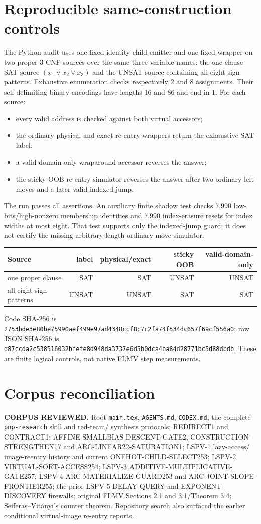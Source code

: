 \documentclass[11pt]{article}
\begin{document}
\section{Reproducible same-construction controls}
The Python audit uses one fixed identity child emitter and one fixed wrapper on
two proper 3-CNF sources over the same three variable names: the one-clause SAT
source $(x_1\vee x_2\vee x_3)$ and the UNSAT source containing all eight sign
patterns.  Exhaustive enumeration checks respectively 2 and 8 assignments.
Their self-delimiting binary encodings have lengths 16 and 86 and end in $1$.
For each source:
\begin{itemize}
\item every valid address is checked against both virtual accessors;
\item the ordinary physical and exact re-entry wrappers return the exhaustive
SAT label;
\item a valid-domain-only wraparound accessor reverses the answer;
\item the sticky-OOB re-entry simulator reverses the answer after two ordinary
left moves and a later valid indexed jump.
\end{itemize}
The run passes all assertions.  An auxiliary finite shadow test checks 7,990
low-bits/high-nonzero membership identities and 7,990 index-erasure resets for
index widths at most eight.  That test supports only the indexed-jump guard;
it does not certify the missing arbitrary-length ordinary-move simulator.

\begin{center}\begin{tabular}{lrrrr}
\toprule
Source&label&physical/exact&sticky OOB&valid-domain-only\\\midrule
one proper clause&SAT&SAT&UNSAT&UNSAT\\
all eight sign patterns&UNSAT&UNSAT&SAT&SAT\\\bottomrule
\end{tabular}\end{center}
Code SHA-256 is
\texttt{2753bde3e80be75990aef499e97ad4348ccf8c7c2fa74f534dc657f69cf556a0};
raw JSON SHA-256 is
\texttt{d87ccda2c538516032bfefe8d948da3737e6d5b0dca4ba84d28771bc5d88dbdb}.
These are finite logical controls, not native FLMV step measurements.

\section{Corpus reconciliation}
\textbf{CORPUS REVIEWED.}  Root \texttt{main.tex}, \texttt{AGENTS.md},
\texttt{CODEX.md}, the complete \texttt{pnp-research} skill and red-team/
synthesis protocols; REDIRECT1 and CONTRACT1; AFFINE-SMALLBIAS-DESCENT-GATE2,
CONSTRUCTION-STRENGTHEN17 and ARC-LINEAR22-SATURATION1; LSPV-1 lazy-access/
image-reentry history and current ONEHOT-CHILD-SELECT253; LSPV-2
VIRTUAL-SORT-ACCESS254; LSPV-3 ADDITIVE-MULTIPLICATIVE-GATE257; LSPV-4
ARC-MATERIALIZE-GUARD253 and ARC-JOINT-SLOPE-FRONTIER255; the prior LSPV-5
DELAY-QUERY and EXPONENT-DISCOVERY firewalls; original FLMV Sections 2.1 and
3.1/Theorem 3.4; Seiferas--Vit\'anyi's counter theorem.  Repository search also
surfaced the earlier conditional virtual-image re-entry reports.
\end{document}
